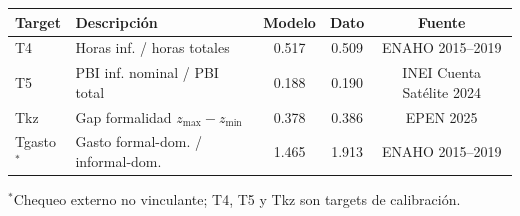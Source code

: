 \documentclass[12pt]{article}
\begin{document}
\begin{center}
\small
\begin{tabular}{llccc}
\toprule
Target & Descripción & Modelo & Dato & Fuente \\
\midrule
T4 & Horas inf. / horas totales & 0.517 & 0.509 & ENAHO 2015--2019 \\
T5 & PBI inf. nominal / PBI total & 0.188 & 0.190 & INEI Cuenta Satélite 2024 \\
Tkz & Gap formalidad $z_{\max} - z_{\min}$ & 0.378 & 0.386 & EPEN 2025 \\
Tgasto$^{*}$ & Gasto formal-dom. / informal-dom. & 1.465 & 1.913 & ENAHO 2015--2019 \\
\bottomrule
\end{tabular}
\par\smallskip\footnotesize $^{*}$Chequeo externo no vinculante; T4, T5 y Tkz son targets de calibración.
\end{center}

\clearpage
\end{document}
